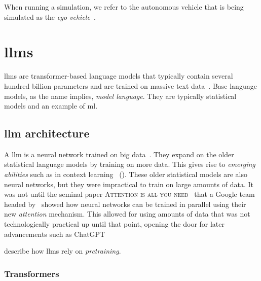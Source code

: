 When running a simulation, we refer to the autonomous vehicle that is being
simulated as the \textit{ego vehicle}~\cite{egoDefinition}.




\section{\acrfull{llms}}

\acrfull{llms} are transformer-based language models that typically contain several hundred billion
parameters and are trained on massive text data~\cite[4]{llmSurvey}.
Base language models, as the name implies, \textit{model language}. They are typically statistical
models and an example of \acrfull{ml}.

\subsection{\acrfull{llm} architecture}\label{sec:llmArch}

A \acrlong{llm} is a neural network trained on big data~\cite[3]{llmSurvey}. They expand on the
older statistical language models by training on more data. This gives rise to \textit{emerging
    abilities} such as in context learning~\cite[3]{llmSurvey} (). These
older statistical models are also neural networks, but they were impractical to train on large
amounts of data. It was not until the seminal paper \textsc{Attention is all you
    need}~\cite{attentionIsAllYouNeed} that a Google team headed by~\citeauthor{attentionIsAllYouNeed}
showed how neural networks can be trained in parallel using their new \textit{attention} mechanism.
This allowed for using amounts of data that was not technologically practical up until that point,
opening the door for later advancements such as
ChatGPT~\cite[9]{llmSurvey}

\citeauthor{jm} describe how \acrshort{llms} rely on \textit{pretraining}.

\subsubsection{Transformers}


